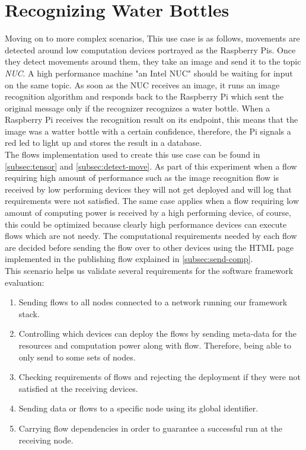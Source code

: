 \section{Recognizing Water Bottles } \label{sec:rwb}


Moving on to more complex scenarios, This use case  is as follows, movements are detected around low computation devices portrayed as the Raspberry Pis. Once they detect movements around them, they take an image and send it to the topic \textit{NUC}. A high performance machine "an Intel NUC" should be waiting for input on the same topic. As soon as the NUC  receives an image, it runs an image recognition algorithm and responds back to the Raspberry Pi which sent the original message  only if the recognizer recognizes a water bottle. When a Raspberry Pi receives the recognition result on its endpoint, this means that the image was a watter bottle with a certain confidence, therefore, the Pi signals a red led to light up and stores the result in a database. \\ 

\noindent The flows implementation used to create this use case can be found in \ref{subsec:tensor} and \ref{subsec:detect-move}.  As part of this experiment when a flow requiring high amount of performance such as the image recognition flow is received by low performing devices they will not get deployed and  will log that requirements were not satisfied. The same case applies when a flow requiring low amount of computing power is received by a high performing device, of course, this could be optimized because clearly high performance devices can execute flows which are not needy. The computational requirements needed by each flow are decided before sending the flow over to other devices using the HTML page implemented in the publishing flow explained in \ref{subsec:send-comp}.\\ 

This scenario helps us validate several requirements for the software framework evaluation: 
\begin{enumerate}
	\item Sending flows to all nodes connected to a network  running our framework stack.
	\item Controlling which devices can deploy the flows by sending meta-data for the resources and computation power along with flow. Therefore, being able to only send to some sets of nodes.
	\item Checking requirements of flows and rejecting the deployment if they were not satisfied at the receiving devices.
	\item Sending data or flows to a  specific node using its global identifier.
	\item Carrying flow dependencies in order to guarantee a successful run at the receiving node.
\end{enumerate}

